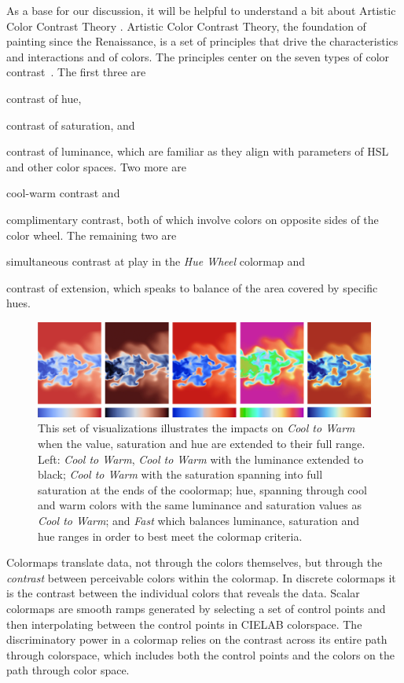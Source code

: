 \documentclass{IEEEcsmag}
\newcommand*{\colormap}[1]{\textsl{#1}\xspace}
\newcommand*{\huewheel}{\colormap{Hue Wheel}}
\newcommand*{\coolwarm}{\colormap{Cool to Warm}}
\newcommand*{\fast}{\colormap{Fast}}
\begin{document}
As a base for our discussion, it will be helpful to understand a bit about Artistic Color Contrast Theory \cite{Itten, Albers}. Artistic Color Contrast Theory, the foundation of painting since the Renaissance, is a set of principles that drive the characteristics and interactions and of colors. The principles center on the seven types of color contrast~\cite{Itten}.
The first three are
\begin{inparaenum}[(1)]
\item contrast of hue,
\item contrast of saturation, and
\item contrast of luminance, which are familiar as they align with parameters of HSL and other color spaces.
Two more are
\item cool-warm contrast and
\item complimentary contrast, both of which involve colors on opposite sides of the color wheel.
The remaining two are
\item simultaneous contrast at play in the \huewheel colormap and
\item contrast of extension, which speaks to balance of the area covered by specific hues.
\end{inparaenum}

\begin{figure}[t]
\centering
\includegraphics[width=\textwidth]{Final_Pics/HSVV.png}
\caption{This set of visualizations illustrates the impacts on \coolwarm when the value, saturation and hue are extended to their full range. Left: \coolwarm, \coolwarm with the luminance extended to black; \coolwarm with the saturation spanning into full saturation at the ends of the coolormap; hue, spanning through cool and warm colors with the same luminance and saturation values as \coolwarm; and \fast which balances luminance, saturation and hue ranges in order to best meet the colormap criteria.}

\label{contrast}
\end{figure}

Colormaps translate data, not through the colors themselves, but through the \textit{contrast} between perceivable colors within the colormap. In discrete colormaps it is the contrast between the individual colors that reveals the data. Scalar colormaps are smooth ramps generated by selecting a set of control points and then interpolating between the control points in CIELAB colorspace. The discriminatory power in a colormap relies on the contrast across its entire path through colorspace, which includes both the control points and the colors on the path through color space.
\end{document}
